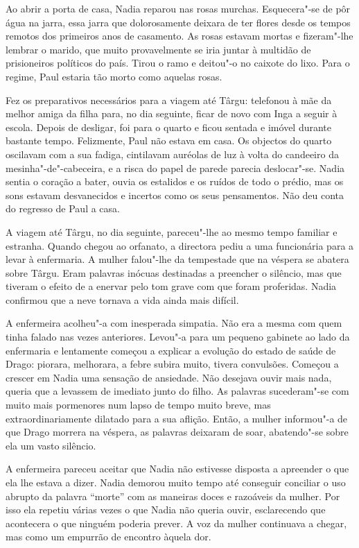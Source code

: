 \bigskip

Ao abrir a porta de casa, Nadia reparou nas rosas murchas.
Esquecera"-se de pôr água na jarra, essa jarra que dolorosamente deixara
de ter flores desde os tempos remotos dos primeiros anos de casamento.
As rosas estavam mortas e fizeram"-lhe lembrar o marido, que muito provavelmente se iria juntar à multidão de prisioneiros políticos
do país. Tirou o ramo e deitou"-o no caixote do lixo. Para o regime, Paul
estaria tão morto como aquelas rosas.

Fez os preparativos necessários para a viagem até Târgu: telefonou à mãe
da melhor amiga da filha para, no dia seguinte, ficar de novo com Inga a
seguir à escola. Depois de desligar, foi para o quarto e ficou sentada e
imóvel durante bastante tempo. Felizmente, Paul não estava em casa. Os
objectos do quarto oscilavam com a sua fadiga, cintilavam auréolas de
luz à volta do candeeiro da mesinha"-de"-cabeceira, e a risca do papel de
parede parecia deslocar"-se. Nadia sentia o coração a bater, ouvia os
estalidos e os ruídos de todo o prédio, mas os sons estavam desvanecidos
e incertos como os seus pensamentos. Não deu conta do regresso de Paul
a casa.

A viagem até Târgu, no dia seguinte, pareceu"-lhe ao mesmo tempo familiar
e estranha. Quando chegou ao orfanato, a directora pediu a uma
funcionária para a levar à enfermaria. A mulher falou"-lhe da tempestade
que na véspera se abatera sobre Târgu. Eram palavras inócuas destinadas
a preencher o silêncio, mas que tiveram o efeito de a enervar pelo tom
grave com que foram proferidas. Nadia confirmou que a neve tornava a
vida ainda mais difícil.

A enfermeira acolheu"-a com inesperada simpatia. Não era a mesma com quem
tinha falado nas vezes anteriores. Levou"-a para um pequeno gabinete ao
lado da enfermaria e lentamente começou a explicar a evolução do estado
de saúde de Drago: piorara, melhorara, a febre subira muito, tivera
convulsões. Começou a crescer em Nadia uma sensação de ansiedade. Não
desejava ouvir mais nada, queria
que a levassem de imediato junto do filho. As palavras sucederam"-se com
muito mais pormenores num lapso de tempo muito breve, mas
extraordinariamente dilatado para a sua aflição. Então, a mulher
informou"-a de que Drago morrera na véspera, as palavras deixaram de
soar, abatendo"-se sobre ela um vasto silêncio.

A enfermeira pareceu aceitar que Nadia não estivesse disposta a
apreender o que ela lhe estava a dizer. Nadia demorou muito tempo até
conseguir conciliar o uso abrupto da palavra ``morte'' com as maneiras
doces e razoáveis da mulher. Por isso ela repetiu várias vezes o que
Nadia não queria ouvir, esclarecendo que acontecera o que ninguém
poderia prever. A voz da mulher continuava a chegar, mas como um
empurrão de encontro àquela dor.

